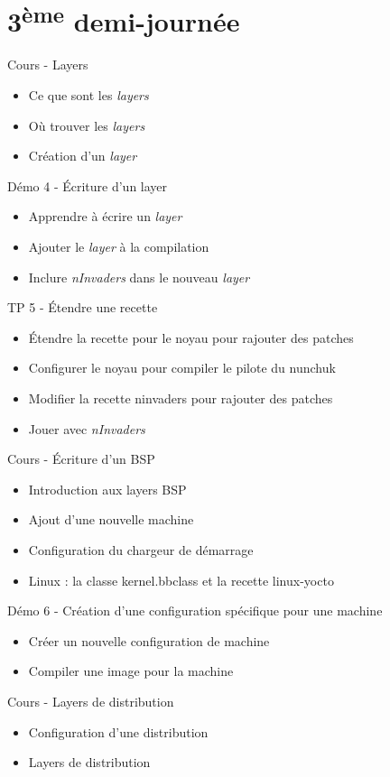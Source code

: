 \documentclass[a4paper,12pt,obeyspaces,spaces,hyphens]{article}
\begin{document}
\section{3\textsuperscript{ème} demi-journée}

\feagendatwocolumn
{Cours - Layers}
{
  \begin{itemize}
  \item Ce que sont les {\em layers}
  \item Où trouver les {\em layers}
  \item Création d'un {\em layer}
  \end{itemize}
}
{Démo 4 - Écriture d'un layer}
{
  \begin{itemize}
  \item Apprendre à écrire un {\em layer}
  \item Ajouter le {\em layer} à la compilation
  \item Inclure {\em nInvaders} dans le nouveau {\em layer}
  \end{itemize}
}

\feagendaonecolumn
{TP 5 - Étendre une recette}
{
  \begin{itemize}
  \item Étendre la recette pour le noyau pour rajouter des patches
  \item Configurer le noyau pour compiler le pilote du nunchuk
  \item Modifier la recette ninvaders pour rajouter des patches
  \item Jouer avec {\em nInvaders}
  \end{itemize}
}

\feagendatwocolumn
{Cours - Écriture d'un BSP}
{
  \begin{itemize}
  \item Introduction aux layers BSP
  \item Ajout d'une nouvelle machine
  \item Configuration du chargeur de démarrage
  \item Linux : la classe kernel.bbclass et la recette linux-yocto
  \end{itemize}
}
{Démo 6 - Création d'une configuration spécifique pour une machine}
{
  \begin{itemize}
  \item Créer un nouvelle configuration de machine
  \item Compiler une image pour la machine
  \end{itemize}
}

\feagendaonecolumn
{Cours - Layers de distribution}
{
  \begin{itemize}
  \item Configuration d'une distribution
  \item Layers de distribution
  \end{itemize}
}
\end{document}
